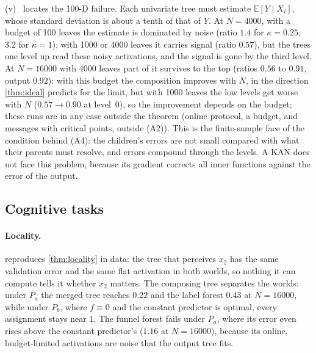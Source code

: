 \documentclass[11pt]{article}
\theoremstyle{definition}
\theoremstyle{remark}
\newcommand{\E}{\mathbb{E}}
\begin{document}
(v)~ locates the 100-D failure.  Each univariate tree must estimate
$\E[Y\mid X_i]$, whose standard deviation is about a tenth of that of $Y$.  At $N=4000$, with a budget
of 100 leaves the estimate is dominated by noise (ratio $1.4$ for $\kappa=0.25$, $3.2$ for
$\kappa=1$); with 1000 or 4000 leaves it carries signal (ratio $0.57$), but the trees one
level up read these noisy activations, and the signal is gone by the third level.  At $N=16000$ with 4000 leaves part of
it survives to the top (ratios $0.56$ to $0.91$, output $0.92$): with this budget the composition improves with $N$, in the direction \cref{thm:ideal}
predicts for the limit, but with 1000 leaves the low levels get worse with $N$ ($0.57\to0.90$
at level~0), so the improvement depends on the budget; these runs are in any case outside
the theorem (online protocol, a budget, and messages with critical points, outside (A2)).  This is the finite-sample face of the
condition behind (A4): the children's errors are not small compared with what their
parents must resolve, and errors compound through the levels.  A KAN does not face this
problem, because its gradient corrects all inner functions against the error of the
output.

\subsection{Cognitive tasks}\label{sec:exp-tasks}

\begin{table}[t]
\centering\small

\caption{The two sign worlds of \cref{thm:locality} (five seeds).  Left: a tree that
perceives $x_2$ and predicts $Y$---its validation RMSE equals that of the constant
predictor ($1.00$) and its activation is flat in both worlds.  Right: the composing
tree's test RMSE for four task assignments.}
\label{tab:locality}
\end{table}

\paragraph{Locality.}
 reproduces \cref{thm:locality} in data: the tree that perceives $x_2$
has the same validation error and the same flat activation in both worlds, so nothing
it can compute tells it whether $x_2$ matters.  The composing tree separates the worlds:
under $P_a$ the merged tree reaches $0.22$ and the label forest $0.43$ at $N=16000$, while
under $P_b$, where $f\equiv0$ and the constant predictor is optimal, every assignment
stays near $1$.  The funnel forest fails under $P_a$, where its error even rises above the constant predictor's ($1.16$ at $N=16000$), because
its online, budget-limited activations are noise that the output tree fits.
\end{document}
